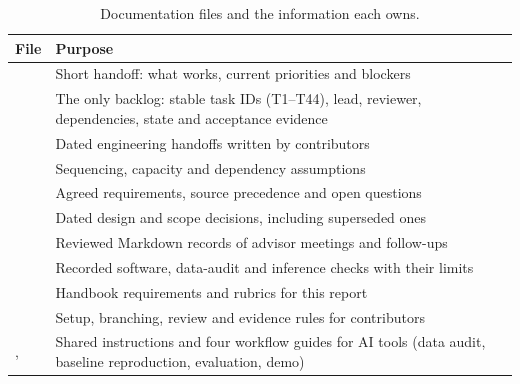 \begin{table}[htbp]
\centering\tablesetup
\caption{Documentation files and the information each owns.}
\label{tab:docs}
\begin{tabularx}{\textwidth}{@{}L{0.34\textwidth}Y@{}}
\toprule
File & Purpose\\
\midrule
{} & Short handoff: what works, current priorities and
blockers\\
 & The only backlog: stable task IDs (T1--T44), lead, reviewer,
dependencies, state and acceptance evidence\\
 & Dated engineering handoffs written by contributors\\
 & Sequencing, capacity and dependency assumptions\\
 & Agreed requirements, source precedence and open questions\\
 & Dated design and scope decisions, including superseded
ones\\
 & Reviewed Markdown records of advisor meetings and
follow-ups\\
 & Recorded software, data-audit and inference checks
with their limits\\
 & Handbook requirements and rubrics for
this report\\
 & Setup, branching, review and evidence rules for
contributors\\
,  & Shared instructions and four workflow
guides for AI tools (data audit, baseline reproduction, evaluation, demo)\\
\bottomrule
\end{tabularx}
\end{table}

